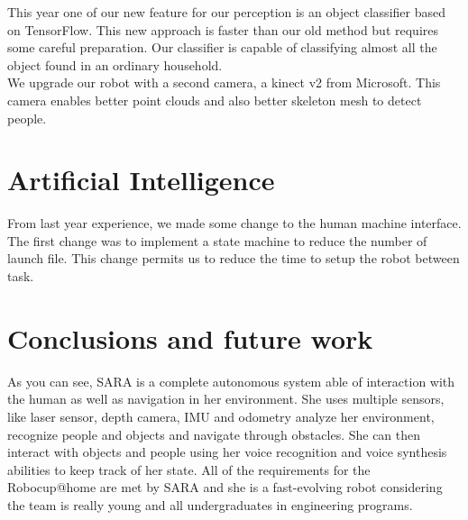 \documentclass[runningheads,a4paper]{llncs}
\begin{document}
\tab This year one of our new feature for our perception is an object classifier based on TensorFlow. This new approach is faster than our old method but requires some careful preparation. Our classifier is capable of classifying almost all the object found in an ordinary household. \\

We upgrade our robot with a second camera, a kinect v2 from Microsoft. This camera enables better point clouds and also better skeleton mesh to detect people. \\

\section{Artificial Intelligence}
\tab From last year experience, we made some change to the human machine interface. \\

The first change was to implement a state machine to reduce the number of launch file. This change permits us to reduce the time to setup the robot between task. 



\section{Conclusions and future work}
\tab As you can see, SARA is a complete autonomous system able of interaction with the human as well as navigation in her environment. She uses multiple sensors, like laser sensor, depth camera, IMU and odometry analyze her environment, recognize people and objects and navigate through obstacles. She can then interact with objects and people using her voice recognition and voice synthesis abilities to keep track of her state. All of the requirements for the Robocup@home are met by SARA and she is a fast-evolving robot considering the team is really young and all undergraduates in engineering programs. 

\newpage

\newpage

\nocite {*}


\end{document}
